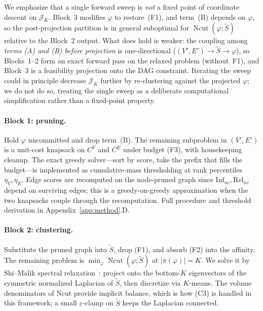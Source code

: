 \documentclass[table, 11pt]{article}
\DeclareMathOperator{\Ncut}{Ncut}
\begin{document}
We emphasize that a single forward sweep is \emph{not} a fixed
point of coordinate descent on $\mathcal{J}_K$. Block~3 modifies
$\varphi$ to restore~(F1), and term~(B) depends on $\varphi$, so
the post-projection partition is in general suboptimal for
$\Ncut(\varphi; \tilde S)$ relative to the Block~2 output. What
does hold is weaker: the coupling among \emph{terms (A) and (B)
before projection} is one-directional
($(V', E') \to \tilde S \to \varphi$), so Blocks~1--2 form an exact
forward pass on the relaxed problem (without~F1), and Block~3 is a
feasibility projection onto the DAG constraint. Iterating the sweep
could in principle decrease $\mathcal{J}_K$ further by re-clustering
against the projected $\varphi$; we do not do so, treating the
single sweep as a deliberate computational simplification rather
than a fixed-point property.

\paragraph{Block 1: pruning.}
Hold $\varphi$ uncommitted and drop term~(B). The remaining
subproblem in $(V', E')$ is a unit-cost knapsack on $C^V$ and $C^E$
under budget (F3), with housekeeping cleanup. The exact greedy
solver---sort by score, take the prefix that fills the budget---is
implemented as cumulative-mass thresholding at rank percentiles
$\eta_V, \eta_E$. Edge scores are recomputed on the node-pruned
graph since $\text{Inf}_{uv}, \text{Rel}_{uv}$ depend on surviving
edges; this is a greedy-on-greedy approximation when the two
knapsacks couple through the recomputation. Full procedure and
threshold derivation in Appendix~\ref{app:method}.D.

\paragraph{Block 2: clustering.}
Substitute the pruned graph into $\tilde S$, drop (F1), and absorb
(F2) into the affinity. The remaining problem is
$\min_\varphi \Ncut(\varphi; \tilde S)$ at $|\pi(\varphi)| = K$.
We solve it by Shi--Malik spectral
relaxation~\cite{shi2000normalized, von2007tutorial}: project onto
the bottom-$K$ eigenvectors of the symmetric normalized Laplacian
of $\tilde S$, then discretize via $K$-means. The volume
denominators of Ncut provide implicit balance, which is how (C3)
is handled in this framework; a small $\varepsilon$-clamp on
$\tilde S$ keeps the Laplacian connected.
\end{document}
